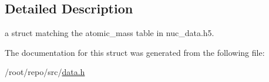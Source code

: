 \subsection{Detailed Description}
a struct matching the atomic\+\_\+mass table in nuc\+\_\+data.\+h5. 

The documentation for this struct was generated from the following file\+:\begin{DoxyCompactItemize}
\item 
/root/repo/src/\hyperlink{data_8h}{data.\+h}\end{DoxyCompactItemize}
